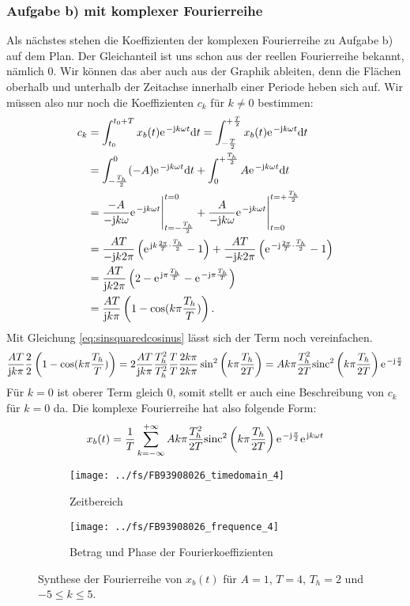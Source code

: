 \documentclass[11pt,a4paper,DIV=12]{scrartcl}
\newcommand{\diff}{\mathrm{d}}
\newcommand{\sinc}{\mathrm{sinc}}
\begin{document}
\subsubsection*{Aufgabe b) mit komplexer Fourierreihe}
Als nächstes stehen die Koeffizienten der komplexen Fourierreihe zu Aufgabe b) auf dem Plan.
%
Der Gleichanteil ist uns schon aus der reellen Fourierreihe bekannt, nämlich $0$. %
Wir können das aber auch aus der Graphik ableiten, denn die Flächen oberhalb und
unterhalb der Zeitachse innerhalb einer Periode heben sich auf.
%
Wir müssen also nur noch die Koeffizienten $c_k$ für $k\neq 0$ bestimmen:
%
%
%
\begin{align}
	c_k&=\int_{t_0}^{t_0+T}x_{b}(t)\e^{-\im k \omega t}\diff t
	=\int_{-\frac{T}{2}}^{+\frac{T}{2}}x_{b}(t)\e^{-\im k \omega t}\diff t \nonumber \\
	&= \int_{-\frac{T_h}{2}}^{0}(-A)\e^{-\im k \omega t}\diff t+\int_{0}^{+\frac{T_h}{2}}A\e^{-\im k \omega t}\diff t  \nonumber \\
	&= \frac{-A}{-\im k \omega}\e^{-\im k \omega t}\Bigg |_{t=-\frac{T_h}{2}}^{t=0}+\frac{A}{-\im k \omega}\e^{-\im k \omega t}\Bigg |_{t=0}^{t=+\frac{T_h}{2}} \nonumber \\
	&= \frac{AT}{-\im k 2\pi }\left (\e^{\im k \frac{2\pi}{T}\cdot \frac{T_h}{2}}-1\right )+\frac{AT}{-\im k 2\pi}\left (\e^{-\im\frac{2\pi}{T}\cdot\frac{T_h}{2}}-1\right )\nonumber \\
	&=\frac{AT}{\im k 2 \pi}\left (2 -\e^{\im\pi\frac{T_h}{T}}-\e^{-\im\pi\frac{T_h}{T}} \right )\nonumber \\
	\label{eq:CKTaskBComplex}
	&=\frac{AT}{\im k \pi}\left ( 1-\cos(k\pi\frac{T_h}{T})\right ).
\end{align}
%
%
%
Mit Gleichung \ref{eq:sinsquaredcosinus} lässt sich der Term noch
vereinfachen.
%
\begin{gather}
	\frac{AT}{\im k \pi}\frac{2}{2}\left ( 1-\cos(k\pi\frac{T_h}{T})\right )
	=2\frac{AT}{\im k\pi}\frac{T_h^2}{T_h^2}\frac{T}{T}\frac{2k\pi}{2k\pi}\sin^2\left(k\pi\frac{T_h}{2T}\right)
	= Ak\pi\frac{T_h^2}{2T} \sinc^2\left(k\pi\frac{T_h}{2T}\right)\e^{-\im\frac{\pi}{2}}
\end{gather}
%
Für $k=0$ ist oberer Term gleich $0$, somit stellt er auch eine Beschreibung von
$c_k$ für $k=0$ da.
%
Die komplexe Fourierreihe hat also folgende Form:
\begin{align}
	x_{b}(t)=\frac{1}{T}\sum_{k=-\infty}^{+\infty}Ak\pi\frac{T_h^2}{2T} \sinc^2\left(k\pi\frac{T_h}{2T}\right)\e^{-\im\frac{\pi}{2}}\e^{\im k \omega t}
\end{align}
%
%
\begin{figure}
	\centering
	\begin{subfigure}{\textwidth}
		\texttt{[image: ../fs/FB93908026\_timedomain\_4]}
		\caption{Zeitbereich}
	\end{subfigure}
	\begin{subfigure}{\textwidth}
		\texttt{[image: ../fs/FB93908026\_frequence\_4]}
		\caption{Betrag und Phase der Fourierkoeffizienten}
	\end{subfigure}
	\caption{Synthese der Fourierreihe von $x_b(t)$ für $A=1$, $T=4$, $T_h=2$ und
		$-5\leq k\leq5$.}
\end{figure}
%
%
\newpage
\end{document}
